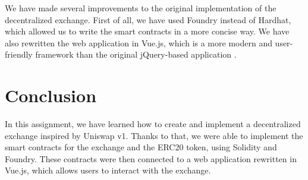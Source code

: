 \documentclass[11pt,a4paper]{article}
\begin{document}
We have made several improvements to the original implementation of the decentralized exchange.
First of all, we have used Foundry instead of Hardhat, which allowed us to write the smart contracts in a more concise way.
We have also rewritten the web application in Vue.js, which is a more modern and user-friendly framework than the original jQuery-based \quote application \quote.

\section{Conclusion}

In this assignment, we have learned how to create and implement a decentralized exchange inspired by Uniswap v1.
Thanks to that, we were able to implement the smart contracts for the exchange and the ERC20 token, using Solidity and Foundry.
These contracts were then connected to a web application rewritten in Vue.js, which allows users to interact with the exchange.



\end{document}
